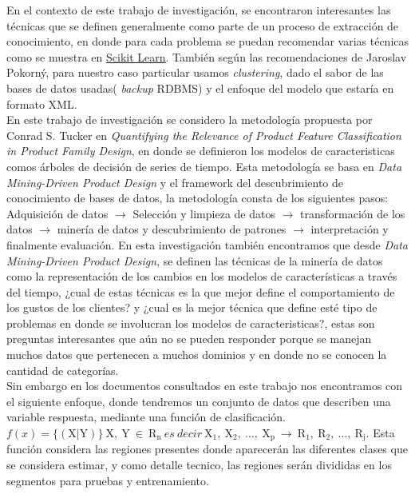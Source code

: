 En el contexto de este trabajo de investigación, se encontraron interesantes las técnicas que se definen generalmente como parte de un proceso de extracción de conocimiento, en donde para cada problema se puedan recomendar varias técnicas como se muestra en  \href{http://scikit-learn.org/stable/tutorial/machine_learning_map/index.html}{Scikit Learn}\cite{scikit-learn}. También según las recomendaciones de Jaroslav Pokorný\cite{Pokorny2015}, para nuestro caso particular usamos \textit{clustering}, dado el sabor de las bases de datos usadas( \textit{backup} RDBMS) y el enfoque del modelo que estaría en formato XML.\\
En este trabajo de investigación se considero la metodología propuesta por Conrad S. Tucker en \textit{Quantifying the Relevance of Product Feature Classification in Product Family Design}\cite{Simpson}, en donde se definieron los modelos de caracteristicas comos árboles de decisión de series de tiempo. Esta metodología se basa en \textit{Data Mining-Driven Product Design} y el framework del descubrimiento de conocimiento de bases de datos, la metodología consta de los siguientes pasos: Adquisición de datos $\rightarrow$ Selección y limpieza de datos $\rightarrow$ transformación de los datos $\rightarrow$ minería de datos y descubrimiento de patrones $\rightarrow$ interpretación y finalmente evaluación.
En esta investigación también encontramos que desde \textit{Data Mining-Driven Product Design}, se definen las técnicas de la minería de datos como la representación de los cambios en los modelos de características a través del tiempo\cite{Zhou2015b}, ¿cual de estas técnicas es la que mejor define el comportamiento de los gustos de los clientes?\cite{Koutanaei2015} y ¿cual es la mejor técnica que define esté tipo de problemas en donde se involucran los modelos de caracteristicas?, estas son preguntas interesantes que aún no se pueden responder porque se manejan muchos datos que pertenecen a muchos dominios y en donde no se conocen la cantidad de categorías.\\
Sin embargo en los documentos consultados en este trabajo nos encontramos con el siguiente enfoque, donde tendremos un conjunto de datos que describen una variable respuesta, mediante una función de clasificación. \\ $f(x)= \{ (\mathrm{X}|\mathrm{Y}) \} \:\mathrm{X},\: \mathrm{Y} \: \in \: \mathrm{R_n} \:es\: decir\: \mathrm{X_1,\: X_2,\: \ldots,\: X_p \:} \rightarrow \:\mathrm{ R_1,\: R_2,\: \ldots,\: R_j }. $ 
Esta función considera las regiones presentes donde aparecerán las diferentes clases que se considera estimar, y como detalle tecnico, las regiones serán divididas en los segmentos para pruebas y entrenamiento. \\
